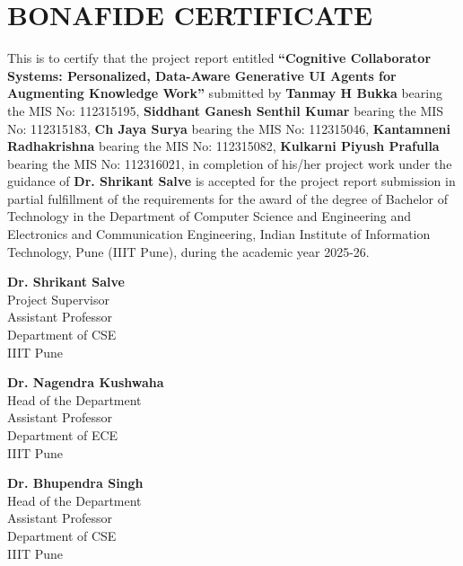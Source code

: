 \documentclass[12pt, a4paper]{report}
\begin{document}



\newpage
\chapter*{BONAFIDE CERTIFICATE}

This is to certify that the project report entitled \textbf{“Cognitive Collaborator Systems: Personalized, Data-Aware Generative UI Agents for Augmenting Knowledge Work”} submitted by \textbf{Tanmay H Bukka} bearing the MIS No: 112315195, \textbf{Siddhant Ganesh Senthil Kumar} bearing the MIS No: 112315183, \textbf{Ch Jaya Surya} bearing the MIS No: 112315046, \textbf{Kantamneni Radhakrishna} bearing the MIS No: 112315082, \textbf{Kulkarni Piyush Prafulla} bearing the MIS No: 112316021, in completion of his/her project work under the guidance of \textbf{Dr. Shrikant Salve} is accepted for the project report submission in partial fulfillment of the requirements for the award of the degree of Bachelor of Technology in the Department of Computer Science and Engineering and Electronics and Communication Engineering, Indian Institute of Information Technology, Pune (IIIT Pune), during the academic year 2025-26.

\vspace{3cm}

\noindent
\begin{minipage}[t]{0.32\textwidth}
    \centering
    \textbf{Dr. Shrikant Salve} \\
    Project Supervisor \\
    Assistant Professor \\
    Department of CSE \\
    IIIT Pune
\end{minipage}
\hfill
\begin{minipage}[t]{0.32\textwidth}
    \centering
    \textbf{Dr. Nagendra Kushwaha} \\
    Head of the Department \\
    Assistant Professor \\
    Department of ECE \\
    IIIT Pune
\end{minipage}
\hfill
\begin{minipage}[t]{0.32\textwidth}
    \centering
    \textbf{Dr. Bhupendra Singh} \\
    Head of the Department \\
    Assistant Professor \\
    Department of CSE \\
    IIIT Pune
\end{minipage}
\vspace{2cm}
\end{document}
